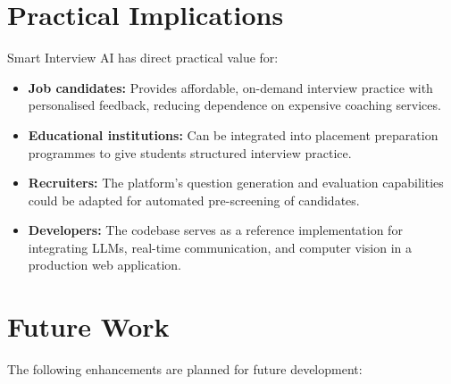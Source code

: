 \section{Practical Implications}

Smart Interview AI has direct practical value for:
\begin{itemize}
    \item \textbf{Job candidates:} Provides affordable, on-demand interview practice with personalised feedback, reducing dependence on expensive coaching services.
    \item \textbf{Educational institutions:} Can be integrated into placement preparation programmes to give students structured interview practice.
    \item \textbf{Recruiters:} The platform's question generation and evaluation capabilities could be adapted for automated pre-screening of candidates.
    \item \textbf{Developers:} The codebase serves as a reference implementation for integrating LLMs, real-time communication, and computer vision in a production web application.
\end{itemize}

\section{Future Work}

The following enhancements are planned for future development:

